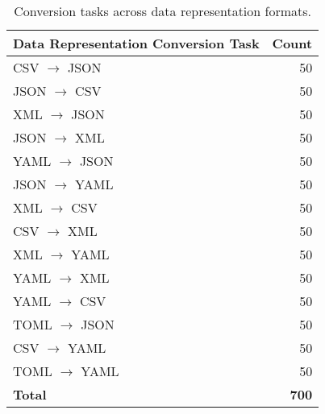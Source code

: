 \begin{table}[h]
\centering
\small
\begin{tabular}{l r}
\toprule
\textbf{Data Representation Conversion Task} & \textbf{Count} \\
\midrule
CSV $\rightarrow$ JSON       & 50 \\
JSON $\rightarrow$ CSV       & 50 \\
XML $\rightarrow$ JSON       & 50 \\
JSON $\rightarrow$ XML       & 50 \\
YAML $\rightarrow$ JSON      & 50 \\
JSON $\rightarrow$ YAML      & 50 \\
XML $\rightarrow$ CSV        & 50 \\
CSV $\rightarrow$ XML        & 50 \\
XML $\rightarrow$ YAML       & 50 \\
YAML $\rightarrow$ XML       & 50 \\
YAML $\rightarrow$ CSV       & 50 \\
TOML $\rightarrow$ JSON      & 50 \\
CSV $\rightarrow$ YAML       & 50 \\
TOML $\rightarrow$ YAML      & 50 \\
\midrule
\textbf{Total}               & \textbf{700} \\
\bottomrule
\end{tabular}
\caption{Conversion tasks across data representation formats.}
\end{table}